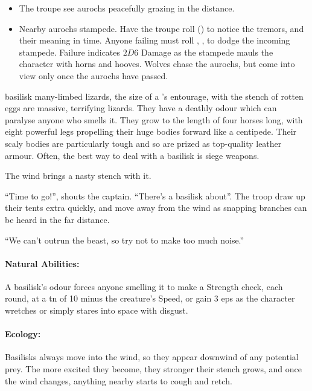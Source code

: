 \begin{multicols}{2}
\begin{itemize}

  \item
  The troupe see aurochs peacefully grazing in the distance.
  \item
  Nearby aurochs stampede.
  Have the troupe roll  (\tn[8]) to notice the tremors, and their meaning in time.
  Anyone failing must roll , \tn[9], to dodge the incoming stampede.
  Failure indicates $2D6$ Damage as the stampede mauls the character with horns and hooves.
  Wolves chase the aurochs, but come into view only once the aurochs have passed.

\end{itemize}

  {basilisk}%
  {many-limbed lizards, the size of a 's entourage, with the stench of rotten eggs}%
are massive, terrifying lizards.
They have a deathly odour which can paralyse anyone who smells it.
They grow to the length of four horses long, with eight powerful legs propelling their huge bodies forward like a centipede.
Their scaly bodies are particularly tough and so are prized as top-quality leather armour.
Often, the best way to deal with a basilisk is siege weapons.

\begin{boxtext}
  The wind brings a nasty stench with it.

  ``Time to go!'', shouts the captain.
  ``There's a basilisk about''.
  The troop draw up their tents extra quickly, and move away from the wind as snapping branches can be heard in the far distance.

  ``We can't outrun the beast, so try not to make too much noise.''
\end{boxtext}

\basilisk

\paragraph{Natural Abilities:} A basilisk's odour forces anyone smelling it to make a Strength check, each round, at a \gls{tn} of 10 minus the creature's Speed, or gain 3 \glspl{ep} as the character wretches or simply stares into space with disgust.

\paragraph{Ecology:}
Basilisks always move into the wind, so they appear downwind of any potential prey.
The more excited they become, they stronger their stench grows, and once the wind changes, anything nearby starts to cough and retch.


\end{multicols}
